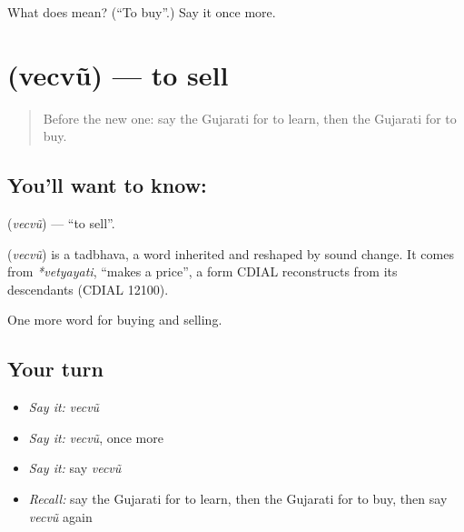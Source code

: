 \begin{tcolorbox}[breakable,colback=teal!4,colframe=teal!35!black,title={Before you move on}]
What does  mean? (\textquotedblleft{}To buy\textquotedblright{}.) Say it once more.
\end{tcolorbox}
\section[\texorpdfstring{\gu{વેચવું} (vecvũ)}{વેચવું (vecvũ)}]{ (vecvũ) — to sell}

\label{lesson:GU-C57-vechvu}



\begin{quote}
Before the new one: say the Gujarati for to learn, then the Gujarati for to buy.
\end{quote}

\subsection*{You'll want to know: }
\textbf{} (\emph{vecvũ}) — \textquotedblleft{}to sell\textquotedblright{}.

\begin{cousinweb}
\textbf{} (\emph{vecvũ}) is a tadbhava, a word inherited and reshaped by sound change. It comes from \emph{*vetyayati}, \textquotedblleft{}makes a price\textquotedblright{}, a form CDIAL reconstructs from its descendants (CDIAL 12100).
\end{cousinweb}

\begin{grammarlens}[title={What you've built}]
One more word for buying and selling.
\end{grammarlens}

\subsection*{Your turn}
\begin{itemize}
\raggedright
  \item \emph{Say it:} \emph{vecvũ}
  \item \emph{Say it:} \emph{vecvũ}, once more
  \item \emph{Say it:} say \emph{vecvũ}
  \item \emph{Recall:} say the Gujarati for to learn, then the Gujarati for to buy, then say \emph{vecvũ} again
\end{itemize}

